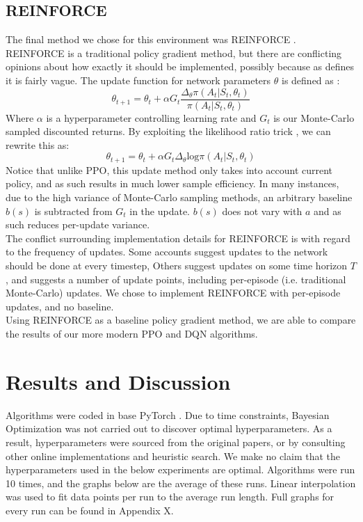 \documentclass{article}
\begin{document}
\subsection{REINFORCE}
The final method we chose for this environment was REINFORCE \citep{williams1992simple}. REINFORCE is a traditional policy gradient method, but there are conflicting opinions about how exactly it should be implemented, possibly because as \citet{williams1992simple} defines it is fairly vague. The update function for network parameters $\theta$ is defined as \citep{10.5555/3312046}:
\begin{equation}
\theta_{t+1} = \theta_{t} + \alpha G_t\frac{\Delta_\theta\pi(A_t| S_t, \theta_t)}{\pi(A_t| S_t, \theta_t)}
\end{equation}
Where $\alpha$ is a hyperparameter controlling learning rate and $G_t$ is our Monte-Carlo sampled discounted returns. By exploiting the likelihood ratio trick \citep{silver2015}, we can rewrite this as:
\begin{equation}
  \theta_{t+1} = \theta_{t} + \alpha G_t\Delta_\theta \text{log} \pi(A_t | S_t, \theta_t)
\end{equation}
Notice that unlike PPO, this update method only takes into account current policy, and as such results in much lower sample efficiency. In many instances, due to the high variance of Monte-Carlo sampling methods, an arbitrary baseline $b(s)$ is subtracted from $G_t$ in the update. $b(s)$ does not vary with $a$ and as such reduces per-update variance. \\\newline
The conflict surrounding implementation details for REINFORCE is with regard to the frequency of updates. Some accounts \citep{10.5555/3312046} suggest updates to the network should be done at every timestep, Others \citep{silver2015} suggest updates on some time horizon $T$, and \citet{williams1992simple} suggests a number of update points, including per-episode (i.e. traditional Monte-Carlo) updates. We chose to implement REINFORCE with per-episode updates, and no baseline. \\\newline
Using REINFORCE as a baseline policy gradient method, we are able to compare the results of our more modern PPO and DQN algorithms.
\section{Results and Discussion}
Algorithms were coded in base PyTorch \citep{NEURIPS2019_9015}. Due to time constraints, Bayesian Optimization was not carried out to discover optimal hyperparameters. As a result, hyperparameters were sourced from the original papers, or by consulting other online implementations and heuristic search. We make no claim that the hyperparameters used in the below experiments are optimal. Algorithms were run 10 times, and the graphs below are the average of these runs. Linear interpolation was used to fit data points per run to the average run length. Full graphs for every run can be found in Appendix X. 
\end{document}
